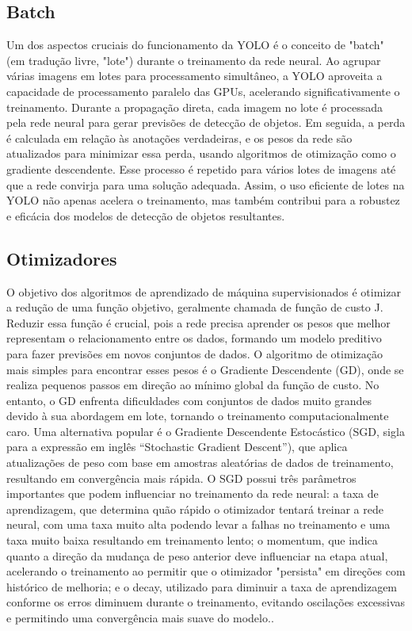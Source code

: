 \subsection{Batch}
\label{sec:batch}

Um dos aspectos cruciais do funcionamento da YOLO é o conceito de "batch" (em tradução livre, "lote") durante o treinamento da rede neural. Ao agrupar várias imagens em lotes para processamento simultâneo, a YOLO aproveita a capacidade de processamento paralelo das GPUs, acelerando significativamente o treinamento. Durante a propagação direta, cada imagem no lote é processada pela rede neural para gerar previsões de detecção de objetos. Em seguida, a perda é calculada em relação às anotações verdadeiras, e os pesos da rede são atualizados para minimizar essa perda, usando algoritmos de otimização como o gradiente descendente. Esse processo é repetido para vários lotes de imagens até que a rede convirja para uma solução adequada. Assim, o uso eficiente de lotes na YOLO não apenas acelera o treinamento, mas também contribui para a robustez e eficácia dos modelos de detecção de objetos resultantes. \cite{goodfellow2016deep}

\subsection{Otimizadores}
\label{sec:otimizadores}

O objetivo dos algoritmos de aprendizado de máquina supervisionados é otimizar a redução de uma função objetivo, geralmente chamada de função de custo J. Reduzir essa função é crucial, pois a rede precisa aprender os pesos que melhor representam o relacionamento entre os dados, formando um modelo preditivo para fazer previsões em novos conjuntos de dados. O algoritmo de otimização mais simples para encontrar esses pesos é o Gradiente Descendente (GD), onde se realiza pequenos passos em direção ao mínimo global da função de custo. No entanto, o GD enfrenta dificuldades com conjuntos de dados muito grandes devido à sua abordagem em lote, tornando o treinamento computacionalmente caro. Uma alternativa popular é o Gradiente Descendente Estocástico (SGD, sigla para a expressão em inglês “Stochastic Gradient Descent”), que aplica atualizações de peso com base em amostras aleatórias de dados de treinamento, resultando em convergência mais rápida. O  SGD possui três parâmetros importantes que podem influenciar no treinamento da rede neural: a taxa de aprendizagem, que determina quão rápido o otimizador tentará treinar a rede neural, com uma taxa muito alta podendo levar a falhas no treinamento e uma taxa muito baixa resultando em treinamento lento; o momentum, que indica quanto a direção da mudança de peso anterior deve influenciar na etapa atual, acelerando o treinamento ao permitir que o otimizador "persista" em direções com histórico de melhoria; e o decay, utilizado para diminuir a taxa de aprendizagem conforme os erros diminuem durante o treinamento, evitando oscilações excessivas e permitindo uma convergência mais suave do modelo.\cite{silva2018estudo}.

